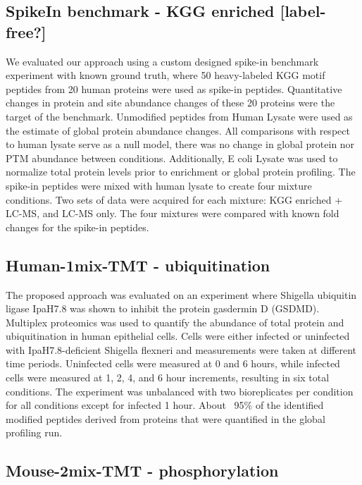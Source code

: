\documentclass[mcp]{article}
\numberwithin{figure}{section} %
\numberwithin{table}{section}
\def\todo#1{{\color{red}[#1]}}
\begin{document}
\subsection*{SpikeIn benchmark - KGG enriched \todo{label-free?}}

We evaluated our approach using a custom designed spike-in benchmark experiment with known ground truth, where 50 heavy-labeled KGG motif peptides from 20 human proteins were used as spike-in peptides. Quantitative changes in protein and site abundance changes of these 20 proteins were the target of the benchmark.  Unmodified peptides from Human Lysate were used as the estimate of global protein abundance changes. All comparisons with respect to human lysate serve as a null model, there was no change in global protein nor PTM abundance between conditions. Additionally, E coli Lysate was used to normalize total protein levels prior to enrichment or global protein profiling. The spike-in peptides were mixed with human lysate to create four mixture conditions. Two sets of data were acquired for each mixture: KGG enriched + LC-MS, and LC-MS only. The four mixtures were compared with known fold changes for the spike-in peptides.

\subsection*{Human-1mix-TMT - ubiquitination}

The proposed approach was evaluated on an experiment where Shigella ubiquitin ligase IpaH7.8 was shown to inhibit the protein gasdermin D (GSDMD).\cite{LUCHETTI2021} Multiplex proteomics was used to quantify the abundance of total protein and ubiquitination in human epithelial cells. Cells were either infected or uninfected with IpaH7.8-deficient Shigella flexneri and measurements were taken at different time periods. Uninfected cells were measured at 0 and 6 hours, while infected cells were measured at 1, 2, 4, and 6 hour increments, resulting in six total conditions. The experiment was unbalanced with two bioreplicates per condition for all conditions except for infected 1 hour. About ~95\% of the identified modified peptides derived from proteins that were quantified in the global profiling run.

\subsection*{Mouse-2mix-TMT - phosphorylation}
\end{document}
